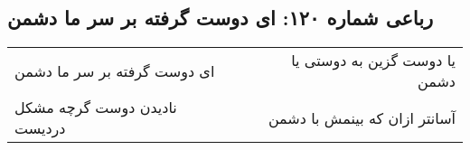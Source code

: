 \begin{center}
\section*{رباعی شماره ۱۲۰: ای دوست گرفته بر سر ما دشمن}
\label{sec:120}
\begin{longtable}{l p{0.5cm} r}
ای دوست گرفته بر سر ما دشمن
&&
یا دوست گزین به دوستی یا دشمن
\\
نادیدن دوست گرچه مشکل دردیست
&&
آسانتر ازان که بینمش با دشمن
\\
\end{longtable}
\end{center}
